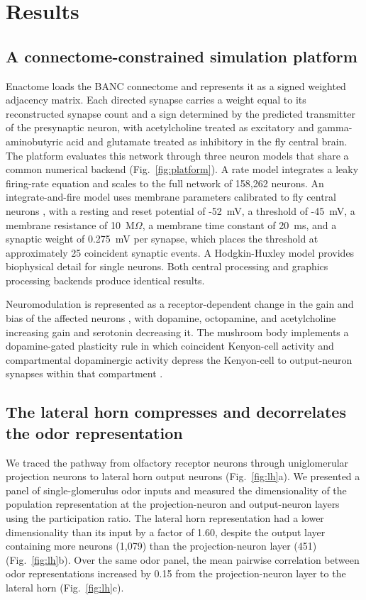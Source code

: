 \documentclass[9pt,twocolumn,twoside]{article}
\begin{document}
\section{Results}

\subsection{A connectome-constrained simulation platform}
Enactome loads the BANC connectome and represents it as a signed weighted adjacency matrix. Each
directed synapse carries a weight equal to its reconstructed synapse count and a sign determined by
the predicted transmitter of the presynaptic neuron, with acetylcholine treated as excitatory and
gamma-aminobutyric acid and glutamate treated as inhibitory in the fly central brain. The platform
evaluates this network through three neuron models that share a common numerical backend
(Fig.~\ref{fig:platform}). A rate model integrates a leaky firing-rate equation and scales to the
full network of 158,262 neurons. An integrate-and-fire model uses membrane parameters calibrated to
fly central neurons \cite{shiu2024,kakaria2017}, with a resting and reset potential of -52~mV, a
threshold of -45~mV, a membrane resistance of 10~M$\Omega$, a membrane time constant of 20~ms, and a
synaptic weight of 0.275~mV per synapse, which places the threshold at approximately 25 coincident
synaptic events. A Hodgkin-Huxley model \cite{hodgkin1952} provides biophysical detail for single
neurons. Both central processing and graphics processing backends produce identical results.

Neuromodulation is represented as a receptor-dependent change in the gain and bias of the affected
neurons \cite{nadim2014}, with dopamine, octopamine, and acetylcholine increasing gain and serotonin
decreasing it. The mushroom body implements a dopamine-gated plasticity rule in which coincident
Kenyon-cell activity and compartmental dopaminergic activity depress the Kenyon-cell to output-neuron
synapses within that compartment \cite{aso2014}.

\subsection{The lateral horn compresses and decorrelates the odor representation}
We traced the pathway from olfactory receptor neurons through uniglomerular projection neurons to
lateral horn output neurons (Fig.~\ref{fig:lh}a). We presented a panel of single-glomerulus odor
inputs and measured the dimensionality of the population representation at the projection-neuron and
output-neuron layers using the participation ratio. The lateral horn representation had a lower
dimensionality than its input by a factor of 1.60, despite the output layer containing more neurons
(1,079) than the projection-neuron layer (451) (Fig.~\ref{fig:lh}b). Over the same odor panel, the
mean pairwise correlation between odor representations increased by 0.15 from the projection-neuron
layer to the lateral horn (Fig.~\ref{fig:lh}c).
\end{document}

